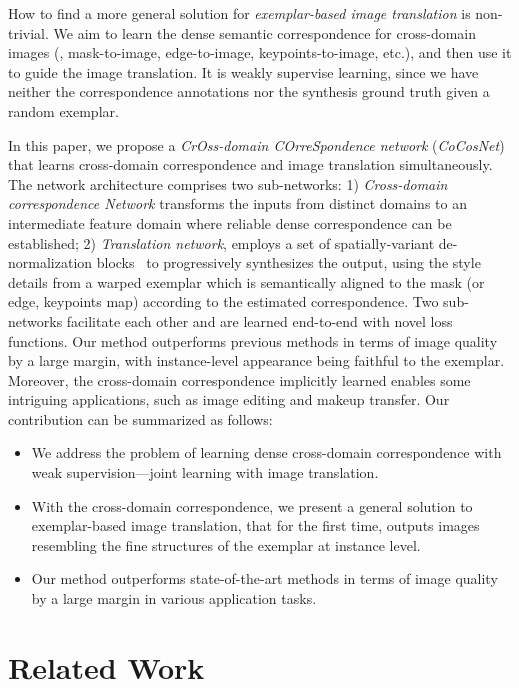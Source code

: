 \documentclass[10pt,twocolumn,letterpaper]{article}
\begin{document}
How to find a more general solution for \emph{exemplar-based image translation} is non-trivial. We aim to learn the dense semantic correspondence for cross-domain images (\eg, mask-to-image, edge-to-image, keypoints-to-image, etc.), and then use it to guide the image translation. It is weakly supervise learning, since we have neither the correspondence annotations nor the synthesis ground truth given a random exemplar.

In this paper, we propose a \emph{{C}r{O}ss-domain {C}{O}rre{S}pondence network} (\emph{CoCosNet}) that learns cross-domain correspondence and image translation simultaneously. The network architecture comprises two sub-networks: 1) \emph{Cross-domain correspondence Network} transforms the inputs from distinct domains to an intermediate feature domain where reliable dense correspondence can be established; 2) \emph{Translation network}, employs a set of spatially-variant de-normalization blocks~\cite{park2019semantic} to progressively synthesizes the output, using the style details from a warped exemplar which is semantically aligned to the mask (or edge, keypoints map) according to the estimated correspondence. Two sub-networks facilitate each other and are learned end-to-end with novel loss functions. Our method outperforms previous methods in terms of image quality by a large margin, with instance-level appearance being faithful to the exemplar. Moreover, the cross-domain correspondence implicitly learned enables some intriguing applications, such as image editing and makeup transfer. Our contribution can be summarized as follows:
\begin{itemize}[leftmargin=*]
\itemsep0em
\item We address the problem of learning dense cross-domain correspondence with weak supervision---joint learning with image translation.
\item With the cross-domain correspondence, we present a general solution to exemplar-based image translation, that for the first time, outputs images resembling the fine structures of the exemplar at instance level.
\item Our method outperforms state-of-the-art methods in terms of image quality by a large margin in various application tasks.
\end{itemize}



 \section{Related Work}
\label{sec:related_work}
\end{document}
